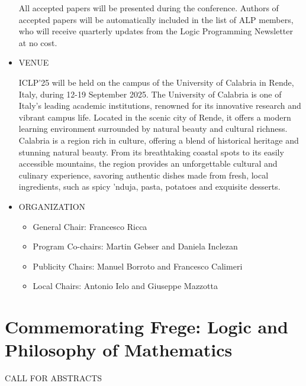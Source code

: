 \documentclass[prodmode,acmtecs]{acmsmall} %
\begin{document}
\begin{itemize}
  All accepted papers will be presented during the conference. Authors of accepted papers will be automatically included in the list of ALP members, who will receive quarterly updates from the Logic Programming Newsletter at no cost. 
 
\item  VENUE  
 
  ICLP’25 will be held on the campus of the University of Calabria in Rende, Italy, during 12-19 September 2025. The University of Calabria is one of Italy's leading academic institutions, renowned for its innovative research and vibrant campus life. Located in the scenic city of Rende, it offers a modern learning environment surrounded by natural beauty and cultural richness. Calabria is a region rich in culture, offering a blend of historical heritage and stunning natural beauty. From its breathtaking coastal spots to its easily accessible mountains, the region provides an unforgettable cultural and culinary experience, savoring authentic dishes made from fresh, local ingredients, such as spicy 'nduja, pasta, potatoes and exquisite desserts. 
 
\item  ORGANIZATION 
 
\begin{itemize}\item  General Chair: Francesco Ricca
\item  Program Co-chairs: Martin Gebser and Daniela Inclezan
\item  Publicity Chairs: Manuel Borroto and Francesco Calimeri
\item  Local Chairs: Antonio Ielo and Giuseppe Mazzotta
\end{itemize} 
\end{itemize}\section{Commemorating Frege: Logic and Philosophy of Mathematics}\label{CommemoratingFrege}CALL FOR ABSTRACTS 
\end{document}
